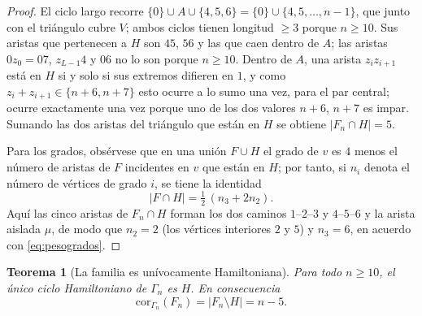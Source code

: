 \documentclass[11pt,a4paper]{article}
\newtheorem{teorema}{Teorema}[section]
\theoremstyle{definition}
\theoremstyle{remark}
\begin{document}
\begin{proof}
El ciclo largo recorre $\{0\}\cup A\cup\{4,5,6\}=\{0\}\cup\{4,5,\dots,n-1\}$, que junto con el triángulo cubre $V$; ambos ciclos tienen longitud $\ge3$ porque $n\ge10$. Sus aristas que pertenecen a $H$ son $45$, $56$ y las que caen dentro de $A$; las aristas $0z_0=07$, $z_{L-1}4$ y $06$ no lo son porque $n\ge10$. Dentro de $A$, una arista $z_iz_{i+1}$ está en $H$ si y solo si sus extremos difieren en $1$, y como $z_i+z_{i+1}\in\{n+6,n+7\}$ esto ocurre a lo sumo una vez, para el par central; ocurre exactamente una vez porque uno de los dos valores $n+6$, $n+7$ es impar. Sumando las dos aristas del triángulo que están en $H$ se obtiene $|F_n\cap H|=5$.

Para los grados, obsérvese que en una unión $F\cup H$ el grado de $v$ es $4$ menos el número de aristas de $F$ incidentes en $v$ que están en $H$; por tanto, si $n_i$ denota el número de vértices de grado $i$, se tiene la identidad
\begin{equation}\label{eq:pesogrados}
|F\cap H|=\tfrac12\,(n_3+2n_2).
\end{equation}
Aquí las cinco aristas de $F_n\cap H$ forman los dos caminos $1$--$2$--$3$ y $4$--$5$--$6$ y la arista aislada $\mu$, de modo que $n_2=2$ (los vértices interiores $2$ y $5$) y $n_3=6$, en acuerdo con \eqref{eq:pesogrados}.
\end{proof}

\begin{teorema}[La familia es unívocamente Hamiltoniana]\label{thm:gamma}
Para todo $n\ge10$, el único ciclo Hamiltoniano de $\Gamma_n$ es $H$. En consecuencia
\[
\mathrm{cor}_{\Gamma_n}(F_n)=|F_n\setminus H|=n-5 .
\]
\end{teorema}
\end{document}
